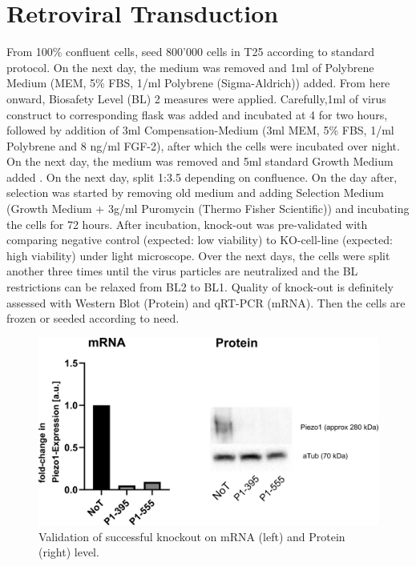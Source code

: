 \section{Retroviral Transduction}
From 100\% confluent cells, seed 800'000 cells in T25 according to standard protocol. On the next day, the medium was removed and 1ml of Polybrene Medium (MEM\textalpha{}, 5\% FBS, 1\mul{}/ml Polybrene (Sigma-Aldrich)) added. From here onward, Biosafety Level (BL) 2 measures were applied. Carefully,1ml of virus construct to corresponding flask was added and incubated at 4 \degC for two hours, followed by addition of 3ml Compensation-Medium (3ml MEM\textalpha{}, 5\% FBS, 1\mul{}/ml Polybrene and 8 ng/ml FGF-2), after which the cells were incubated over night. On the next day, the medium was removed and 5ml standard Growth Medium added . On the next day, split 1:3.5 depending on confluence. On the day after, selection was started by removing old medium and adding Selection Medium (Growth Medium + 3\textmu{}g/ml Puromycin (Thermo Fisher Scientific)) and incubating the cells for 72 hours. After incubation, knock-out was pre-validated with comparing negative control (expected: low viability) to KO-cell-line (expected: high viability) under light microscope. Over the next days, the cells were split another three times until the virus particles are neutralized and the BL restrictions can be relaxed from BL2 to BL1. Quality of knock-out is definitely assessed with Western Blot (Protein) and qRT-PCR (mRNA). Then the cells are frozen or seeded according to need. 

\begin{figure}
    \centering
    \includegraphics[width=\linewidth]{Piezo1KO_Verification_WBandPCR.png}
    \caption{Validation of successful knockout on mRNA (left) and Protein (right) level.}
    \label{fig:KO-Verification}
\end{figure}

